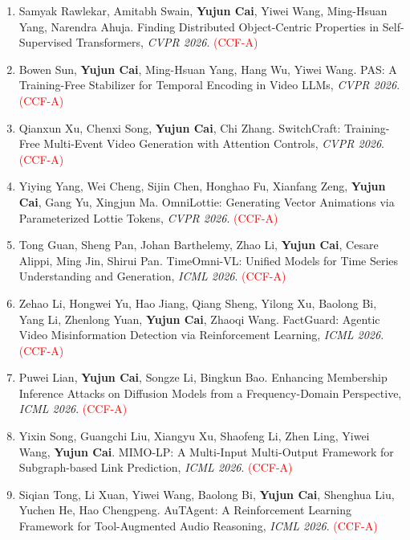 \documentclass[11pt,letterpaper]{article}
\begin{document}
\begin{enumerate}
\item Samyak Rawlekar, Amitabh Swain, \textbf{Yujun Cai}, Yiwei Wang, Ming-Hsuan Yang, Narendra Ahuja. Finding Distributed Object-Centric Properties in Self-Supervised Transformers, \textit{CVPR 2026}. \textcolor{red}{(CCF-A)}

\item Bowen Sun, \textbf{Yujun Cai}, Ming-Hsuan Yang, Hang Wu, Yiwei Wang. PAS: A Training-Free Stabilizer for Temporal Encoding in Video LLMs, \textit{CVPR 2026}. \textcolor{red}{(CCF-A)}

\item Qianxun Xu, Chenxi Song, \textbf{Yujun Cai}, Chi Zhang. SwitchCraft: Training-Free Multi-Event Video Generation with Attention Controls, \textit{CVPR 2026}. \textcolor{red}{(CCF-A)}

\item Yiying Yang, Wei Cheng, Sijin Chen, Honghao Fu, Xianfang Zeng, \textbf{Yujun Cai}, Gang Yu, Xingjun Ma. OmniLottie: Generating Vector Animations via Parameterized Lottie Tokens, \textit{CVPR 2026}. \textcolor{red}{(CCF-A)}

\item Tong Guan, Sheng Pan, Johan Barthelemy, Zhao Li, \textbf{Yujun Cai}, Cesare Alippi, Ming Jin, Shirui Pan. TimeOmni-VL: Unified Models for Time Series Understanding and Generation, \textit{ICML 2026}. \textcolor{red}{(CCF-A)}

\item Zehao Li, Hongwei Yu, Hao Jiang, Qiang Sheng, Yilong Xu, Baolong Bi, Yang Li, Zhenlong Yuan, \textbf{Yujun Cai}, Zhaoqi Wang. FactGuard: Agentic Video Misinformation Detection via Reinforcement Learning, \textit{ICML 2026}. \textcolor{red}{(CCF-A)}

\item Puwei Lian, \textbf{Yujun Cai}, Songze Li, Bingkun Bao. Enhancing Membership Inference Attacks on Diffusion Models from a Frequency-Domain Perspective, \textit{ICML 2026}. \textcolor{red}{(CCF-A)}

\item Yixin Song, Guangchi Liu, Xiangyu Xu, Shaofeng Li, Zhen Ling, Yiwei Wang, \textbf{Yujun Cai}. MIMO-LP: A Multi-Input Multi-Output Framework for Subgraph-based Link Prediction, \textit{ICML 2026}. \textcolor{red}{(CCF-A)}

\item Siqian Tong, Li Xuan, Yiwei Wang, Baolong Bi, \textbf{Yujun Cai}, Shenghua Liu, Yuchen He, Hao Chengpeng. AuTAgent: A Reinforcement Learning Framework for Tool-Augmented Audio Reasoning, \textit{ICML 2026}. \textcolor{red}{(CCF-A)}


\end{enumerate}
\end{document}
